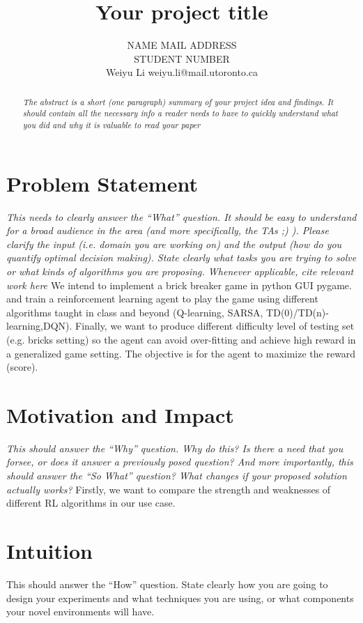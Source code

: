 \documentclass[twoside,11pt]{article}
\title{Your project title}
\author{\name NAME \email MAIL ADDRESS \\
       \addr STUDENT NUMBER\\
       \AND
      \name Weiyu Li \email weiyu.li@mail.utoronto.ca \\
       \addr 1003765981}
\begin{document}
\maketitle

\begin{abstract}%
\textit{
The abstract is a short (one paragraph) summary of your project idea and findings. It should contain all the necessary info a reader needs to have to quickly understand what you did and why it is valuable to read your paper}

\textit{}
\end{abstract}

\section{Problem Statement}

    \textit{
    This needs to clearly answer the “What” question.
    It should be easy to understand for a broad audience in the area (and more specifically, the TAs ;) ).
    Please clarify the input (i.e. domain you are working on) and the output (how do you quantify optimal decision making).
    State clearly what tasks you are trying to solve or what kinds of algorithms you are proposing.
    Whenever applicable, cite relevant work here \cite{chow:68,pearl:88,claas}
}
\newline \newline
We intend to implement a brick breaker game in python GUI pygame. and train a reinforcement learning agent to play the game using different algorithms taught in class and beyond (Q-learning, SARSA, TD(0)/TD(n)-learning,DQN). Finally, we want to produce different difficulty level of testing set (e.g. bricks setting) so the agent can avoid over-fitting and achieve high reward in a generalized game setting. The objective is for the agent to maximize the reward (score). 
\section{Motivation and Impact}
\textit{
    This should answer the “Why” question.
    Why do this? Is there a need that you forsee, or does it answer a previously posed question?
    And more importantly, this should answer the “So What” question? What changes if your proposed solution actually works?
}
Firstly, we want to compare the strength and weaknesses of different RL algorithms in our use case.

\section{Intuition}

    This should answer the “How” question.
    State clearly how you are going to design your experiments and what techniques you are using, or what components your novel environments will have.






\end{document}
